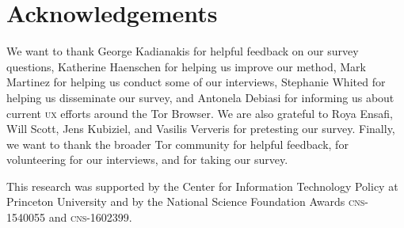 \section*{Acknowledgements}

We want to thank George Kadianakis for helpful feedback on our survey questions,
Katherine Haenschen for helping us improve our method, Mark Martinez for helping
us conduct some of our interviews, Stephanie Whited for helping us disseminate
our survey, and Antonela Debiasi for informing us about current \textsc{ux}
efforts around the Tor Browser.  We are also grateful to Roya Ensafi, Will
Scott, Jens Kubiziel, and Vasilis Ververis for pretesting our survey.  Finally,
we want to thank the broader Tor community for helpful feedback, for
volunteering for our interviews, and for taking our survey.

This research was supported by the Center for Information Technology Policy at
Princeton University and by the National Science Foundation Awards
\textsc{cns}-1540055 and \textsc{cns}-1602399.
